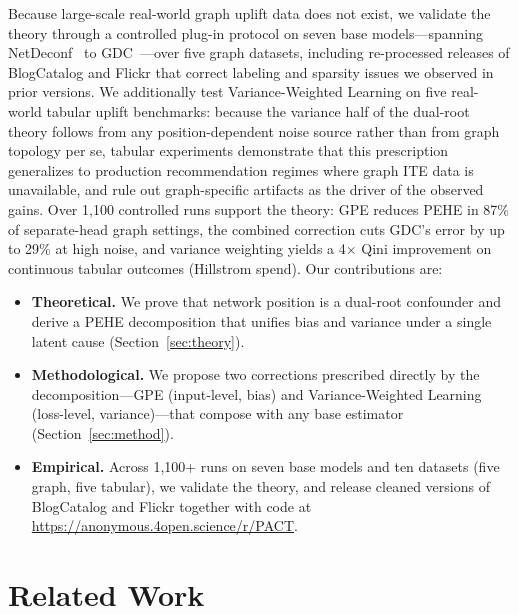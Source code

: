 \documentclass[sigconf,anonymous,review]{acmart}
\begin{document}
Because large-scale real-world graph uplift data does not exist, we validate the theory through a controlled plug-in protocol on seven base models---spanning NetDeconf~\cite{guo2020learning} to GDC~\cite{hu2025gdc}---over five graph datasets, including re-processed releases of BlogCatalog and Flickr that correct labeling and sparsity issues we observed in prior versions. We additionally test Variance-Weighted Learning on five real-world tabular uplift benchmarks: because the variance half of the dual-root theory follows from any position-dependent noise source rather than from graph topology per se, tabular experiments demonstrate that this prescription generalizes to production recommendation regimes where graph ITE data is unavailable, and rule out graph-specific artifacts as the driver of the observed gains. Over 1{,}100 controlled runs support the theory: GPE reduces PEHE in 87\% of separate-head graph settings, the combined correction cuts GDC's error by up to 29\% at high noise, and variance weighting yields a 4$\times$ Qini improvement on continuous tabular outcomes (Hillstrom spend). Our contributions are:
\begin{itemize}[leftmargin=*, itemsep=1pt, topsep=2pt]
    \item \textbf{Theoretical.} We prove that network position is a dual-root confounder and derive a PEHE decomposition that unifies bias and variance under a single latent cause (Section~\ref{sec:theory}).
    \item \textbf{Methodological.} We propose two corrections prescribed directly by the decomposition---GPE (input-level, bias) and Variance-Weighted Learning (loss-level, variance)---that compose with any base estimator (Section~\ref{sec:method}).
    \item \textbf{Empirical.} Across 1{,}100+ runs on seven base models and ten datasets (five graph, five tabular), we validate the theory, and release cleaned versions of BlogCatalog and Flickr together with code at \url{https://anonymous.4open.science/r/PACT}.
\end{itemize}

\section{Related Work}\label{sec:related}
\end{document}
